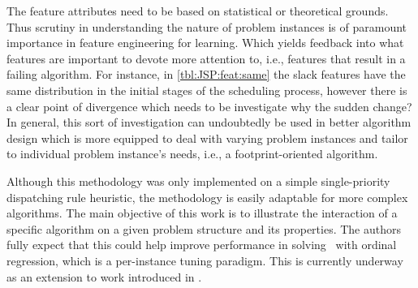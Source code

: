 The feature attributes need to be based on statistical or theoretical grounds. Thus scrutiny in understanding the nature of problem instances is of paramount importance in feature engineering for learning. Which yields feedback into what features are important to devote more attention to, i.e., features that result in a failing algorithm. For instance, in \cref{tbl:JSP:feat:same} the slack features have the same distribution in the initial stages of the scheduling process, however there is a clear point of divergence which needs to be investigate why the sudden change? 
In general, this sort of investigation can undoubtedly be used in better algorithm design which is more equipped to deal with varying problem instances and tailor to individual problem instance's needs, i.e., a footprint-oriented algorithm. 

Although this methodology was only implemented on a simple single-priority dispatching rule heuristic, the methodology is easily adaptable for more complex algorithms. The main objective of this work is to illustrate the interaction of a specific algorithm on a given problem structure and its properties.
The authors fully expect that this could help improve performance in solving \JSP\ with ordinal regression, which is a per-instance tuning paradigm. This is currently underway as an extension to work introduced in \cite{InRu11a}.



